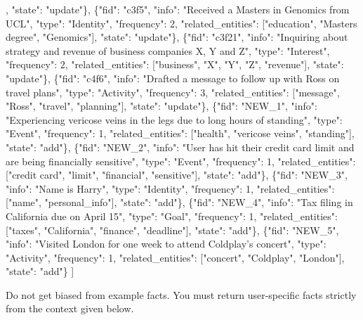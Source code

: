 \begin{promptbox}
\begin{tcolorbox}[colback=gray!10, colframe=gray!50, title=Example/Format, breakable]
[
  \{"fid": "c2f10", "info": "Prefers vegan food and healthy lifestyle", "type": "Preference", "frequency": 3, "related\_entities": ["food", "vegan", "health"], "state": "update"\},\vspace{0.5em}
  \{"fid": "c3f5", "info": "Received a Masters in Genomics from UCL", "type": "Identity", "frequency": 2, "related\_entities": ["education", "Masters degree", "Genomics"], "state": "update"\},\vspace{0.5em}
  \{"fid": "c3f21", "info": "Inquiring about strategy and revenue of business companies X, Y and Z", "type": "Interest", "frequency": 2, "related\_entities": ["business", "X", "Y", "Z", "revenue"], "state": "update"\},\vspace{0.5em}
  \{"fid": "c4f6", "info": "Drafted a message to follow up with Ross on travel plans", "type": "Activity", "frequency": 3, "related\_entities": ["message", "Ross", "travel", "planning"], "state": "update"\},\vspace{0.5em}
  \{"fid": "NEW\_1", "info": "Experiencing vericose veins in the legs due to long hours of standing", "type": "Event", "frequency": 1, "related\_entities": ["health", "vericose veins", "standing"], "state": "add"\},\vspace{0.5em}
  \{"fid": "NEW\_2", "info": "User has hit their credit card limit and are being financially sensitive", "type": "Event", "frequency": 1, "related\_entities": ["credit card", "limit", "financial", "sensitive"], "state": "add"\},\vspace{0.5em}
  \{"fid": "NEW\_3", "info": "Name is Harry", "type": "Identity", "frequency": 1, "related\_entities": ["name", "personal\_info"], "state": "add"\},\vspace{0.5em}
  \{"fid": "NEW\_4", "info": "Tax filing in California due on April 15", "type": "Goal", "frequency": 1, "related\_entities": ["taxes", "California", "finance", "deadline"], "state": "add"\},\vspace{0.5em}
  \{"fid": "NEW\_5", "info": "Visited London for one week to attend Coldplay's concert", "type": "Activity", "frequency": 1, "related\_entities": ["concert", "Coldplay", "London"], "state": "add"\}\vspace{0.5em}
]
\end{tcolorbox}

Do not get biased from example facts. You must return user-specific facts strictly from the context given below.


\end{promptbox}
